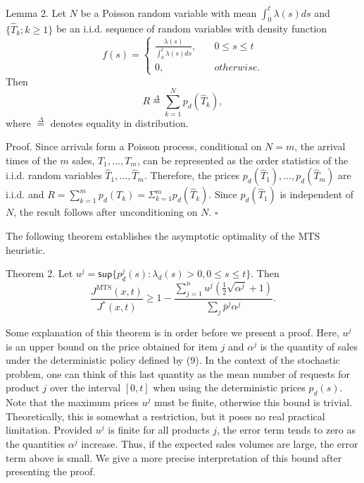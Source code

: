 Lemma 2. Let \(N\) be a Poisson random variable with mean \(\int_{0}^{t} \lambda(s)  ds\) and \(\{ \hat{T}_k ; k \ge 1 \}\) be an i.i.d. sequence of random variables with density function
\[
f(s) = \left\{ \begin{array}{ll}
\displaystyle \frac{\lambda(s)}{\int_{0}^{t} \lambda(s)  ds}, \quad & 0 \leqslant s \leqslant t \\
0, \quad & otherwise.
\end{array} \right.
\]
Then
\[
R \overset{\Delta}{=} \sum_{k=1}^{N} p_d(\hat{T}_k) ,
\]
where \(\overset{\Delta}{=}\) denotes equality in distribution.

Proof. Since arrivals form a Poisson process, conditional on \(N = m\), the arrival times of the \(m\) sales, \(T_1, \dots, T_m\), can be represented as the order statistics of the i.i.d. random variables \(\hat{T}_1, \dots, \hat{T}_m\). Therefore, the prices \(p_d(\hat{T}_1), \dots, p_d(\hat{T}_m)\) are i.i.d. and \(R = \sum_{k=1}^{m} p_d(T_k) = \Sigma_{k=1}^{m} p_d(\hat{T}_k)\). Since \(p_d(\hat{T}_1)\) is independent of \(N\), the result follows after unconditioning on \(N\). \(\square\)

The following theorem establishes the asymptotic optimality of the MTS heuristic.

Theorem 2. Let \(u^j = \mathsf{sup} \{ p_d^j(s) \colon \lambda_d(s) > 0, 0 \leqslant s \leqslant t \}\). Then
\[
\frac{J^{\mathrm{MTS}}(x, t)}{J^{*}(x, t)} \geqslant 1 - \frac{\sum_{j=1}^{n} u^j \left( \frac{1}{2} \sqrt{\alpha^j} + 1 \right)} {\sum_{j} \bar{p}^j \alpha^j} .
\]

Some explanation of this theorem is in order before we present a proof. Here, \(u^j\) is an upper bound on the price obtained for item \(j\) and \(\alpha^j\) is the quantity of sales under the deterministic policy defined by (9). In the context of the stochastic problem, one can think of this last quantity as the mean number of requests for product \(j\) over the interval \([0, t]\) when using the deterministic prices \(p_d(s)\). Note that the maximum prices \(u^j\) must be finite, otherwise this bound is trivial. Theoretically, this is somewhat a restriction, but it poses no real practical limitation. Provided \(u^j\) is finite for all products \(j\), the error term tends to zero as the quantities \(\alpha^j\) increase. Thus, if the expected sales volumes are large, the error term above is small. We give a more precise interpretation of this bound after presenting the proof.

